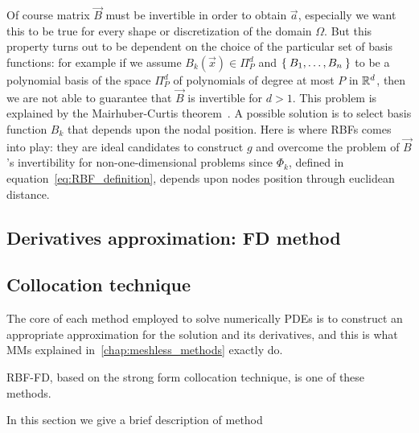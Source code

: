 Of course matrix $\vec{B}$ must be invertible in order to obtain $\vec{a}$, especially we want this to be true for every shape or discretization of the domain $\Omega$. But this property turns out to be dependent on the choice of the particular set of basis functions: for example if we assume $B_k(\vec{x})\in\Pi_P^d$ and $\Set{B_1, \dots, B_n}$ to be a polynomial basis of the space $\Pi_P^d$ of polynomials of degree at most $P$ in $\mathbb{R}^d$, then we are not able to guarantee that $\vec{B}$ is invertible for $d>1$.  This problem is explained by the Mairhuber-Curtis theorem~\cite{Mairhuber:interpolation_basis_problem}. A possible solution is to select basis function  $B_k$ that depends upon the nodal position.
Here is where RBFs comes into play: they are ideal candidates to construct $g$ and overcome the problem of $\vec{B}$'s invertibility for non-one-dimensional problems since $\varPhi_k$, defined in equation~\eqref{eq:RBF_definition}, depends upon nodes position through euclidean distance.

\subsection{Derivatives approximation: FD method}

\subsection{Collocation technique}

The core of each method employed to solve numerically  PDEs is to construct an appropriate approximation for the solution and its derivatives, and this is what MMs explained in~\ref{chap:meshless_methods} exactly do.

RBF-FD, based on the strong form collocation technique, is one of these methods. 

In this section we give a brief description of method 


